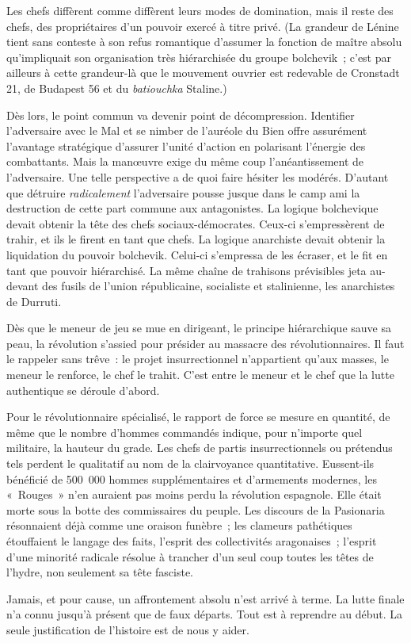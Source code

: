 \documentclass[french,twoside]{book} %
\begin{document}
\noindent Les chefs diffèrent comme diffèrent leurs modes de domination, mais il reste des chefs, des propriétaires d’un pouvoir exercé à titre privé. (La grandeur de Lénine tient sans conteste à son refus romantique d’assumer la fonction de maître absolu qu’impliquait son organisation très hiérarchisée du groupe bolchevik ; c’est par ailleurs à cette grandeur-là que le mouvement ouvrier est redevable de Cronstadt 21, de Budapest 56 et du \emph{batiouchka} Staline.)\par
Dès lors, le point commun va devenir point de décompression. Identifier l’adversaire avec le Mal et se nimber de l’auréole du Bien offre assurément l’avantage stratégique d’assurer l’unité d’action en polarisant l’énergie des combattants. Mais la manœuvre exige du même coup l’anéantissement de l’adversaire. Une telle perspective a de quoi faire hésiter les modérés. D’autant que détruire \emph{radicalement} l’adversaire pousse jusque dans le camp ami la destruction de cette part commune aux antagonistes. La logique bolchevique devait obtenir la tête des chefs sociaux-démocrates. Ceux-ci s’empressèrent de trahir, et ils le firent en tant que chefs. La logique anarchiste devait obtenir la liquidation du pouvoir bolchevik. Celui-ci s’empressa de les écraser, et le fit en tant que pouvoir hiérarchisé. La même chaîne de trahisons prévisibles jeta au-devant des fusils de l’union républicaine, socialiste et stalinienne, les anarchistes de Durruti.\par
Dès que le meneur de jeu se mue en dirigeant, le principe hiérarchique sauve sa peau, la révolution s’assied pour présider au massacre des révolutionnaires. Il faut le rappeler sans trêve : le projet insurrectionnel n’appartient qu’aux masses, le meneur le renforce, le chef le trahit. C’est entre le meneur et le chef que la lutte authentique se déroule d’abord.\par
Pour le révolutionnaire spécialisé, le rapport de force se mesure en quantité, de même que le nombre d’hommes commandés indique, pour n’importe quel militaire, la hauteur du grade. Les chefs de partis insurrectionnels ou prétendus tels perdent le qualitatif au nom de la clairvoyance quantitative. Eussent-ils bénéficié de 500 000 hommes supplémentaires et d’armements modernes, les « Rouges » n’en auraient pas moins perdu la révolution espagnole. Elle était morte sous la botte des commissaires du peuple. Les discours de la Pasionaria résonnaient déjà comme une oraison funèbre ; les clameurs pathétiques étouffaient le langage des faits, l’esprit des collectivités aragonaises ; l’esprit d’une minorité radicale résolue à trancher d’un seul coup toutes les têtes de l’hydre, non seulement sa tête fasciste.\par
Jamais, et pour cause, un affrontement absolu n’est arrivé à terme. La lutte finale n’a connu jusqu’à présent que de faux départs. Tout est à reprendre au début. La seule justification de l’histoire est de nous y aider.\par
\end{document}
